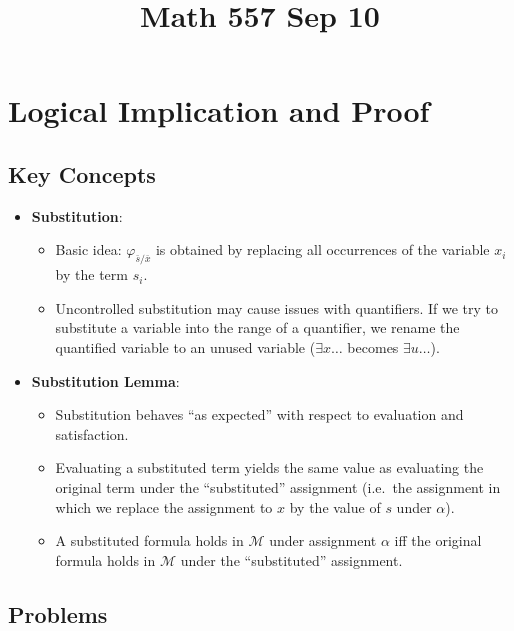 \documentclass[
]{article}
\title{Math 557 Sep 10}
\author{}
\date{}
\providecommand{\tightlist}{%
  \setlength{\itemsep}{0pt}\setlength{\parskip}{0pt}}
\theoremstyle{definition}
\theoremstyle{remark}
\begin{document}
\maketitle


\section{Logical Implication and
Proof}\label{logical-implication-and-proof}

\subsection{Key Concepts}\label{key-concepts}

\begin{itemize}
\item
  \textbf{Substitution}:

  \begin{itemize}
  \tightlist
  \item
    Basic idea: \(\varphi_{\bar{s}/\bar{x}}\) is obtained by replacing
    all occurrences of the variable \(x_i\) by the term \(s_i\).
  \item
    Uncontrolled substitution may cause issues with quantifiers. If we
    try to substitute a variable into the range of a quantifier, we
    rename the quantified variable to an unused variable
    (\(\exists x \dots\) becomes \(\exists u \dots\)).
  \end{itemize}
\item
  \textbf{Substitution Lemma}:

  \begin{itemize}
  \tightlist
  \item
    Substitution behaves ``as expected'' with respect to evaluation and
    satisfaction.
  \item
    Evaluating a substituted term yields the same value as evaluating
    the original term under the ``substituted'' assignment (i.e.~the
    assignment in which we replace the assignment to \(x\) by the value
    of \(s\) under \(\alpha\)).
  \item
    A substituted formula holds in \(\mathcal{M}\) under assignment
    \(\alpha\) iff the original formula holds in \(\mathcal{M}\) under
    the ``substituted'' assignment.
  \end{itemize}
\end{itemize}

\subsection{Problems}\label{problems}
\end{document}
